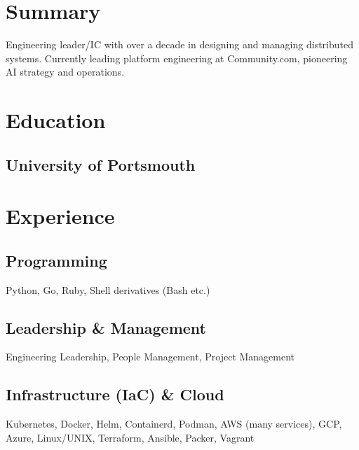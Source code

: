 \documentclass[]{resume}
\begin{document}
\hfill
\begin{minipage}[t]{0.33\textwidth}


\section{Summary}
Engineering leader/IC with over a decade in designing and managing distributed systems. Currently leading platform engineering at Community.com, pioneering AI strategy and operations. 
\sectionsep


\section{Education}

\subsection{University of Portsmouth}
\sectionsep


\section{Experience}
\subsection{Programming}
Python, Go, Ruby, Shell derivatives (Bash etc.)
\sectionsep

\subsection{Leadership \& Management}
Engineering Leadership, People Management, Project Management

\subsection{Infrastructure (IaC) \& Cloud}
Kubernetes, Docker, Helm, Containerd, Podman, AWS (many services), GCP, Azure, Linux/UNIX, Terraform, Ansible, Packer, Vagrant
\sectionsep


\end{minipage}
\end{document}

